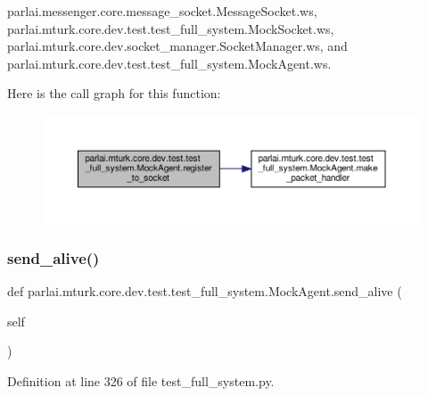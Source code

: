 parlai.\+messenger.\+core.\+message\+\_\+socket.\+Message\+Socket.\+ws, parlai.\+mturk.\+core.\+dev.\+test.\+test\+\_\+full\+\_\+system.\+Mock\+Socket.\+ws, parlai.\+mturk.\+core.\+dev.\+socket\+\_\+manager.\+Socket\+Manager.\+ws, and parlai.\+mturk.\+core.\+dev.\+test.\+test\+\_\+full\+\_\+system.\+Mock\+Agent.\+ws.

Here is the call graph for this function\+:
\nopagebreak
\begin{figure}[H]
\begin{center}
\leavevmode
\includegraphics[width=350pt]{classparlai_1_1mturk_1_1core_1_1dev_1_1test_1_1test__full__system_1_1MockAgent_a97d5a5cb8bf72c4a294e51e0cf275911_cgraph}
\end{center}
\end{figure}
\mbox{\label{classparlai_1_1mturk_1_1core_1_1dev_1_1test_1_1test__full__system_1_1MockAgent_a2a8aaa90f95349b4de8517bfd6d010d6}} 
\subsubsection{\texorpdfstring{send\+\_\+alive()}{send\_alive()}}
{\footnotesize\ttfamily def parlai.\+mturk.\+core.\+dev.\+test.\+test\+\_\+full\+\_\+system.\+Mock\+Agent.\+send\+\_\+alive (\begin{DoxyParamCaption}\item[{}]{self }\end{DoxyParamCaption})}



Definition at line 326 of file test\+\_\+full\+\_\+system.\+py.




